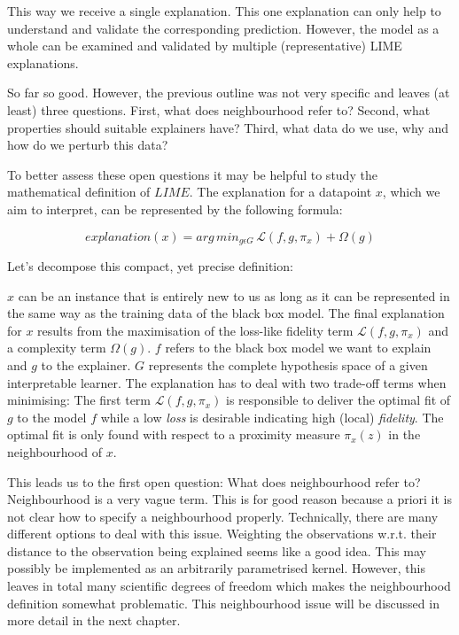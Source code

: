 \documentclass[
]{krantz}
\begin{document}
This way we receive a single explanation.
This one explanation can only help to understand and validate the corresponding prediction.
However, the model as a whole can be examined and validated by multiple (representative) LIME explanations.

So far so good.
However, the previous outline was not very specific and leaves (at least) three questions.
First, what does neighbourhood refer to?
Second, what properties should suitable explainers have?
Third, what data do we use, why and how do we perturb this data?

To better assess these open questions it may be helpful to study the mathematical definition of \(LIME\).
The explanation for a datapoint \(x\), which we aim to interpret, can be represented by the following formula:

\[explanation\left(x\right) = arg\,min_{g \epsilon G} \,\mathcal{L}\left(f, g, \pi_x \right) + \Omega\left(g\right)\]

Let's decompose this compact, yet precise definition:

\(x\) can be an instance that is entirely new to us as long as it can be represented in the same way as the training data of the black box model.
The final explanation for \(x\) results from the maximisation of the loss-like fidelity term \(\mathcal{L}\left(f, g, \pi_x \right)\) and a complexity term \(\Omega\left(g\right)\).
\(f\) refers to the black box model we want to explain and \(g\) to the explainer.
\(G\) represents the complete hypothesis space of a given interpretable learner.
The explanation has to deal with two trade-off terms when minimising:
The first term \(\mathcal{L}\left(f, g, \pi_x \right)\) is responsible to deliver the optimal fit of \(g\) to the model \(f\) while a low \emph{loss} is desirable indicating high (local) \emph{fidelity}.
The optimal fit is only found with respect to a proximity measure \(\pi_x(z)\) in the neighbourhood of \(x\).

This leads us to the first open question:
What does neighbourhood refer to?
Neighbourhood is a very vague term.
This is for good reason because a priori it is not clear how to specify a neighbourhood properly.
Technically, there are many different options to deal with this issue.
Weighting the observations w.r.t. their distance to the observation being explained seems like a good idea.
This may possibly be implemented as an arbitrarily parametrised kernel.
However, this leaves in total many scientific degrees of freedom which makes the neighbourhood definition somewhat problematic.
This neighbourhood issue will be discussed in more detail in the next chapter.
\end{document}
